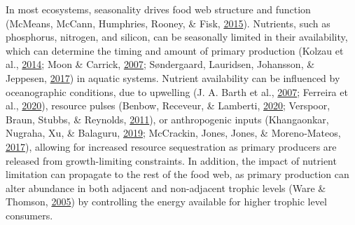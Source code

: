 \documentclass [11pt, proquest] {uwthesis}[2015/03/03]
\begin{document}
In most ecosystems, seasonality drives food web structure and function
(McMeans, McCann, Humphries, Rooney, \& Fisk,
\protect\hyperlink{ref-McMeans2015}{2015}). Nutrients, such as
phosphorus, nitrogen, and silicon, can be seasonally limited in their
availability, which can determine the timing and amount of primary
production (Kolzau et al., \protect\hyperlink{ref-Kolzau2014}{2014};
Moon \& Carrick, \protect\hyperlink{ref-Moon2007}{2007}; Søndergaard,
Lauridsen, Johansson, \& Jeppesen,
\protect\hyperlink{ref-Sondergaard2017}{2017}) in aquatic systems.
Nutrient availability can be influenced by oceanographic conditions, due
to upwelling (J. A. Barth et al.,
\protect\hyperlink{ref-Barth2007}{2007}; Ferreira et al.,
\protect\hyperlink{ref-Ferreira2020}{2020}), resource pulses (Benbow,
Receveur, \& Lamberti, \protect\hyperlink{ref-Benbow2020}{2020};
Verspoor, Braun, Stubbs, \& Reynolds,
\protect\hyperlink{ref-Verspoor2011}{2011}), or anthropogenic inputs
(Khangaonkar, Nugraha, Xu, \& Balaguru,
\protect\hyperlink{ref-Khangaonkar2019}{2019}; McCrackin, Jones, Jones,
\& Moreno‐Mateos, \protect\hyperlink{ref-McCrackin2017}{2017}), allowing
for increased resource sequestration as primary producers are released
from growth-limiting constraints. In addition, the impact of nutrient
limitation can propagate to the rest of the food web, as primary
production can alter abundance in both adjacent and non-adjacent trophic
levels (Ware \& Thomson, \protect\hyperlink{ref-Ware2005}{2005}) by
controlling the energy available for higher trophic level consumers.
\end{document}
